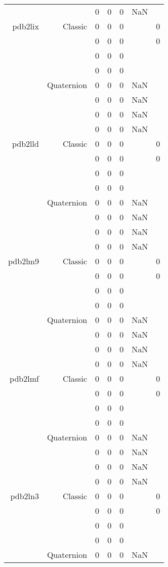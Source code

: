 \begin{xltabular}{\textwidth}{r|rcccSc}
& & 0 & 0 & 0 & NaN & \\ \addlinespace
pdb2lix & Classic & 0 & 0 & 0 & & 0 \\
& & 0 & 0 & 0 & & 0 \\
& & 0 & 0 & 0 & & \\
& & 0 & 0 & 0 & & \\
& Quaternion & 0 & 0 & 0 & NaN & \\
& & 0 & 0 & 0 & NaN & \\
& & 0 & 0 & 0 & NaN & \\
& & 0 & 0 & 0 & NaN & \\ \addlinespace
pdb2lld & Classic & 0 & 0 & 0 & & 0 \\
& & 0 & 0 & 0 & & 0 \\
& & 0 & 0 & 0 & & \\
& & 0 & 0 & 0 & & \\
& Quaternion & 0 & 0 & 0 & NaN & \\
& & 0 & 0 & 0 & NaN & \\
& & 0 & 0 & 0 & NaN & \\
& & 0 & 0 & 0 & NaN & \\ \addlinespace
pdb2lm9 & Classic & 0 & 0 & 0 & & 0 \\
& & 0 & 0 & 0 & & 0 \\
& & 0 & 0 & 0 & & \\
& & 0 & 0 & 0 & & \\
& Quaternion & 0 & 0 & 0 & NaN & \\
& & 0 & 0 & 0 & NaN & \\
& & 0 & 0 & 0 & NaN & \\
& & 0 & 0 & 0 & NaN & \\ \addlinespace
pdb2lmf & Classic & 0 & 0 & 0 & & 0 \\
& & 0 & 0 & 0 & & 0 \\
& & 0 & 0 & 0 & & \\
& & 0 & 0 & 0 & & \\
& Quaternion & 0 & 0 & 0 & NaN & \\
& & 0 & 0 & 0 & NaN & \\
& & 0 & 0 & 0 & NaN & \\
& & 0 & 0 & 0 & NaN & \\ \addlinespace
pdb2ln3 & Classic & 0 & 0 & 0 & & 0 \\
& & 0 & 0 & 0 & & 0 \\
& & 0 & 0 & 0 & & \\
& & 0 & 0 & 0 & & \\
& Quaternion & 0 & 0 & 0 & NaN & \\

\end{xltabular}
